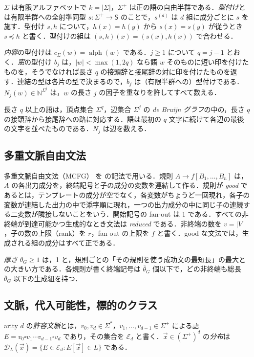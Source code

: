 \documentclass[11pt,a4paper]{ltjsarticle}
\numberwithin{equation}{section}
\theoremstyle{plain}
\theoremstyle{definition}
\theoremstyle{remark}
\theoremstyle{plain}
\newcommand{\D}{\mathcal{D}}
\newcommand{\E}{\mathcal{E}}
\newcommand{\tuple}[1]{\vec{#1}}
\newcommand{\blank}{\square}
\newcommand{\alphset}{\operatorname{alph}}
\newcommand{\bth}{\bar\theta}
\begin{document}
$\Sigma$ は有限アルファベットで $k=|\Sigma|$，$\Sigma^+$ は正の語の自由半群である．\emph{型付け}とは有限半群への全射準同型 $s:\Sigma^+\to\mathsf S$ のことで，$s^{(d)}$ は $d$ 組に成分ごとに $s$ を施す．型付け $s,h$ について，$h(x)=h(y)$ から $s(x)=s(y)$ が従うとき $s\preceq h$ と書く．型付けの組は $(s,h)(x)=(s(x),h(x))$ で合わせる．

\emph{内容}の型付けは $c_\Sigma(w)=\alphset(w)$ である．$j\ge1$ について $q=j-1$ とおく．\emph{窓}の型付け $b_j$ は，$|w|<\max(1,2q)$ なら語 $w$ そのものに短い印を付けたものを，そうでなければ長さ $q$ の接頭辞と接尾辞の対に印を付けたものを返す．連結の型は各片の型で決まるので，$b_j$ は（有限半群への）型付けである．$N_j(w)\in\mathbb N^{\Sigma^j}$ は，$w$ の長さ $j$ の因子を重なりを許してすべて数える．

長さ $q$ 以上の語は，頂点集合 $\Sigma^q$，辺集合 $\Sigma^j$ の \emph{de Bruijn グラフ}の中の，長さ $q$ の接頭辞から接尾辞への路に対応する．語は最初の $q$ 文字に続けて各辺の最後の文字を並べたものである．$N_j$ は辺を数える．

\subsection{多重文脈自由文法}

多重文脈自由文法（MCFG）\cite{SekiEtAl1991} を \cite{Yoshinaka2011} の記法で用いる．規則 $A\to f[B_1,\ldots,B_n]$ は，$A$ の各出力成分を，終端記号と子の成分の変数を連結して作る．規則が \emph{good} であるとは，テンプレートの成分が空でなく，各変数がちょうど一回現れ，各子の変数が連結した出力の中で添字順に現れ，一つの出力成分の中に同じ子の連続する二変数が隣接しないことをいう．開始記号の fan-out は 1 である．すべての非終端が到達可能かつ生成的なとき文法は \emph{reduced} である．非終端の数を $v=|V|$，子の数の上限（rank）を $r$，fan-out の上限を $f$ と書く．good な文法では，生成される組の成分はすべて正である．

\emph{厚さ} $\bth_G\ge1$ は，1 と，規則ごとの「その規則を使う成功文の最短長」の最大との大きい方である．各規則が書く終端記号は $\bth_G$ 個以下で，どの非終端も総長 $\bth_G$ 以下の生成組を持つ．

\subsection{文脈，代入可能性，標的のクラス}

arity $d$ の\emph{許容文脈}とは，$v_0,v_d\in\Sigma^*$，$v_1,\ldots,v_{d-1}\in\Sigma^+$ による語 $E=v_0\blank v_1\cdots v_{d-1}\blank v_d$ であり，その集合を $\E_d$ と書く．$\tuple x\in(\Sigma^+)^d$ の\emph{分布}は $\D_L(\tuple x)=\{E\in\E_d:E[\tuple x]\in L\}$ である．
\end{document}
